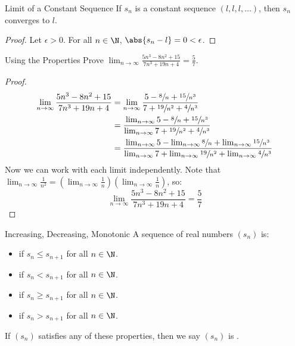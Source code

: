 \begin{lembox}{Limit of a Constant Sequence}{}
    If $s_n$ is a constant sequence $(l, l, l, \ldots)$, then $s_n$ converges to $l$.
    \tcblower
    \begin{proof}
        Let $\epsilon > 0$. For all $n \in \N$, $\abs{s_n - l} = 0 < \epsilon$.
    \end{proof}
\end{lembox}

\begin{exbox}{Using the Properties}{}
    Prove $\lim_{n \to \infty} \frac{5n^3 - 8n^2 + 15}{7n^3 + 19n + 4} = \frac{5}{7}$.
    \tcblower
    \begin{proof}
        \begin{align*}
            \lim_{n \to \infty} \frac{5n^3 - 8n^2 + 15}{7n^3 + 19n + 4}
            &= \lim_{n \to \infty} \frac{5 - \sfrac{8}{n} + \sfrac{15}{n^3}}{7 + \sfrac{19}{n^2} + \sfrac{4}{n^3}} \\
            &= \frac{\lim_{n \to \infty} 5 - \sfrac{8}{n} + \sfrac{15}{n^3} }{\lim_{n \to \infty} 7 + \sfrac{19}{n^2} + \sfrac{4}{n^3}} \\
            &= \frac{ \lim_{n \to \infty} 5 - \lim_{n \to \infty} \sfrac{8}{n} + \lim_{n \to \infty} \sfrac{15}{n^3} }{ \lim_{n \to \infty} 7 + \lim_{n \to \infty} \sfrac{19}{n^2} + \lim_{n \to \infty} \sfrac{4}{n^3} }
        \end{align*}
        Now we can work with each limit independently. Note that $\lim_{n \to \infty} \frac{1}{n^2} = \left( \lim_{n \to \infty} \frac{1}{n} \right) \left( \lim_{n \to \infty} \frac{1}{n} \right)$, so:
        \[ \lim_{n \to \infty} \frac{5n^3 - 8n^2 + 15}{7n^3 + 19n + 4} = \frac{5}{7} \]
    \end{proof}
\end{exbox}

\begin{dfnbox}{Increasing, Decreasing, Monotonic}{}
    A sequence of real numbers $(s_n)$ is:
    \begin{itemize}[noitemsep]
        \item {} if $s_n \leq s_{n+1}$ for all $n \in \N$.
        \item {} if $s_n < s_{n+1}$ for all $n \in \N$.
        \item {} if $s_n \geq s_{n+1}$ for all $n \in \N$.
        \item {} if $s_n > s_{n+1}$ for all $n \in \N$.
    \end{itemize}
    If $(s_n)$ satisfies any of these properties, then we say $(s_n)$ is .
\end{dfnbox}

